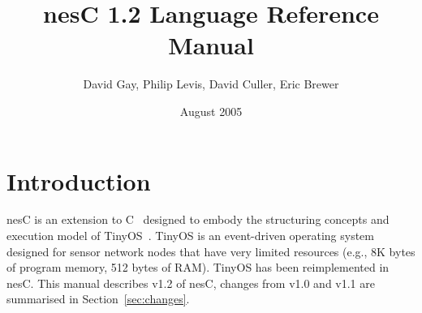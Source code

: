\documentclass[11pt,letterpaper]{article}
\newcommand{\nesc}{nesC\xspace}
\newcommand{\tinyos}{TinyOS\xspace}
\begin{document}
\title{\nesc 1.2 Language Reference Manual}
\author{David Gay, Philip Levis, David Culler, Eric Brewer}
\date{August 2005}

\maketitle

\section{Introduction}

\nesc is an extension to C~\cite{kandr} designed to embody the structuring
concepts and execution model of \tinyos~\cite{tinyos}. \tinyos is an
event-driven operating system designed for sensor network nodes that have
very limited resources (e.g., 8K bytes of program memory, 512 bytes of
RAM). \tinyos has been reimplemented in \nesc. This manual describes v1.2 of
\nesc, changes from v1.0 and v1.1 are summarised in Section~\ref{sec:changes}.
\end{document}
